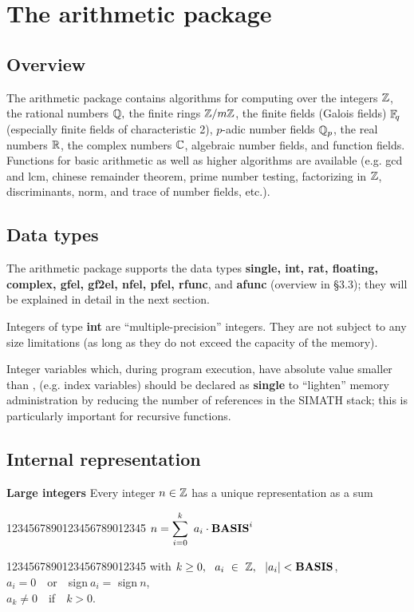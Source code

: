 \newpage  


\section{The arithmetic package}
\subsection{Overview}
The arithmetic package contains algorithms for computing over the integers $\mbox{$\mathbb Z$}$,
the rational numbers $\mbox{$\mathbb Q$},$ the finite rings $\mbox{$\mathbb Z$}/m\mbox{$\mathbb Z$}$, the finite fields
(Galois fields)  $\mbox{$\mathbb F$}\!_q$ (especially finite fields of characteristic 2),
$p$-adic number fields $\mbox{$\mathbb Q$}\!\,_p$, the real numbers $\mbox{$\mathbb R$}$, the complex numbers $\mbox{$\mathbb C$}$,
algebraic number fields, and function fields. Functions for basic arithmetic as 
well as higher algorithms are available (e.g. gcd and lcm, chinese remainder 
theorem, prime number testing, factorizing in $\mbox{$\mathbb Z$}$, discriminants, norm, and 
trace of number fields, etc.).

\subsection{Data types}
The arithmetic package supports the data types {\bf single, int, rat, floating, 
complex, gfel, gf2el, nfel, pfel, rfunc}, and {\bf afunc} (overview in \S 3.3); 
they  will be explained in detail in the next section.  

Integers of type {\bf int} are ``multiple-precision'' integers.  They are not subject to any
size limitations (as long as they do not exceed the capacity of the memory).

Integer variables which, during program execution, have absolute value smaller than
, (e.g.\/ index variables) should be declared as {\bf single}
to ``lighten'' memory administration by reducing the number of references in the
SIMATH stack; this is particularly important for recursive functions.

\subsection{Internal representation}

{\bf Large integers}
\leer 
Every integer $n \in \mbox{$\mathbb Z$}$ has a unique representation as a sum
\begin{tabbing}
     1234567890123456789012345\= \kill
     \> ${\displaystyle  n = \sum_{i=0}^{k}\  a_i\cdot \mbox{\bf BASIS}^i} $\\
\end{tabbing}
\begin{tabbing}
      1234567890123456789012345\= \kill
      with  \> $ k \geq 0,\ \  a_i\ \in\ \Z,\ \  |a_i| < \mbox{\bf BASIS}$,\\
       \> $a_i = 0$\ \  or\ \  sign$\ a_i = $ sign$\ n$,\\
       \> $a_k \not= 0$\ \  if\ \   $k > 0$.
\end{tabbing}

